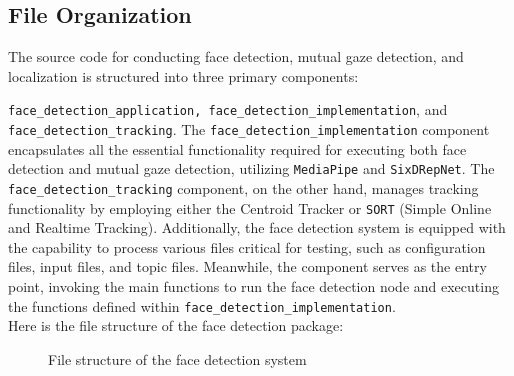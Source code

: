 \documentclass{CSSRforAfrica}
\begin{document}
\subsection*{File Organization}
The source code for conducting face detection, mutual gaze detection, and localization is structured into three primary components: {\fontsize{9.0}{10.0}\selectfont\texttt{{face\_detection\_application}, \texttt{face\_detection\_implementation}}, and \small{\texttt{face\_detection\_tracking}}. The \texttt{face\_detection\_implementation} component encapsulates all the essential functionality required for executing both face detection and mutual gaze detection, utilizing \texttt{MediaPipe} and \texttt{SixDRepNet}. The \texttt{face\_detection\_tracking} component, on the other hand, manages tracking functionality by employing either the Centroid Tracker or \texttt{SORT} (Simple Online and Realtime Tracking). Additionally, the face detection system is equipped with the capability to process various files critical for testing, such as configuration files, input files, and topic files. Meanwhile, the {\fontsize{8.0}{9.0}} component serves as the entry point, invoking the main functions to run the face detection node and executing the functions defined within \texttt{face\_detection\_implementation}.\\

Here is the file structure of the face detection package:

\begin{figure}[h]	
	\renewcommand*\DTstyle{\ttfamily}
	\caption{File structure of the face detection system}
	\label{fig:face_detection_directory}
\end{figure}

\newpage
}
\end{document}

